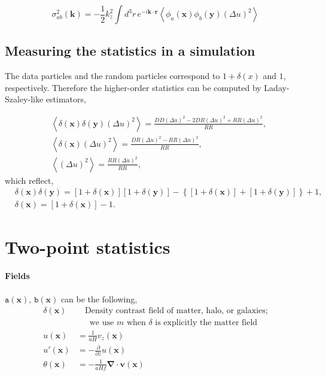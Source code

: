 \documentclass[a4paper,11pt, fleqn]{article}
\begin{document}
\begin{equation}
  \sigma_{ab}^2(\bm{k}) = -\frac{1}{2} k_z^2 \int\! d^3 r\,
    e^{-i\bm{k}\cdot\bm{r}} \left\langle
    \phi_a(\bm{x}) \phi_b(\bm{y}) (\Delta u)^2
  \right\rangle
\end{equation}


\subsection{Measuring the statistics in a simulation}

The data particles and the random particles correspond to $1 +
\delta(x)$ and $1$, respectively. Therefore the higher-order statistics
can be computed by Laday-Szaley-like estimators,

\begin{align}
  &\left\langle \delta(\bm{x}) \delta(\bm{y}) (\Delta u)^2 \right\rangle
    = \frac{DD (\Delta u)^2 - 2 DR (\Delta u)^2 + RR (\Delta u)^2}{RR},\\
  &\left\langle \delta(\bm{x}) (\Delta u)^2 \right\rangle
    = \frac{DR (\Delta u)^2 - RR (\Delta u)^2}{RR},\\
  &\left\langle (\Delta u)^2 \right\rangle
    = \frac{RR (\Delta u)^2}{RR},
\end{align}
which reflect,
\begin{align}
  &\delta(\bm{x})\delta(\bm{y})
    = [ 1 + \delta(\bm{x}) ][ 1 + \delta(\bm{y}) ]
      - \left\{ [ 1 + \delta(\bm{x}) ] + [ 1 + \delta(\bm{y}) ] \right\} + 1,\\
  &\delta(\bm{x})
    = [ 1 + \delta(\bm{x}) ] - 1.
\end{align}


\clearpage
%
%
\appendix

\sectionfont{\sffamily\Huge\color{Blue}\selectfont}
\subsectionfont{\sffamily\color{Blue}\selectfont}
\subsubsectionfont{\sffamily\color{Blue}\selectfont}
\paragraphfont{\sffamily\color{Blue}\selectfont}

%
%
\section{Two-point statistics}

\paragraph{Fields}
$\mathtt{a}(\bm{x})$, $\mathtt{b}(\bm{x})$ can be the following,
%
\begin{align}
  \delta(\bm{x}) &\phantom{=\,} \mbox{Density contrast field of matter, halo, or galaxies;}\\
            &\phantom{=\,} \mbox{we use $m$ when $\delta$ is explicitly the matter field}\\
  u(\bm{x}) &= \frac{1}{aH} v_z(\bm{x})\\
  u'(\bm{x}) &= -\frac{\partial}{\partial z} u(\bm{x})\\
  \theta(\bm{x}) &= - \frac{1}{aHf} \bm{\nabla}\cdot \bm{v}(\bm{x})
\end{align}
\end{document}
